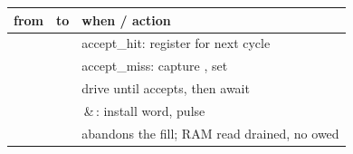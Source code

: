 \begin{center}\small
\begin{tabularx}{\textwidth}{l l Y}
\toprule
\textbf{from} & \textbf{to} & \textbf{when / action}\\\midrule
{} &  & accept\_hit: register  for next cycle\\
 &  & accept\_miss: capture , set \\
 &  & drive  until  accepts, then await \\
 &  & \,\&\,: install word, pulse \\
 &  &  abandons the fill; RAM read drained, no  owed\\
\bottomrule
\end{tabularx}
\end{center}
